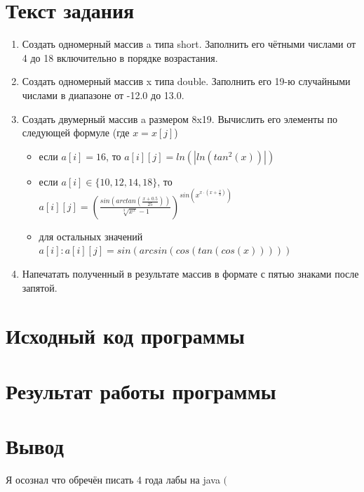 \documentclass{article}
\begin{document}


\section*{Текст задания}

\begin{enumerate}
  \item Создать одномерный массив a типа short. Заполнить его чётными числами от 4 до 18 включительно в порядке возрастания.
  \item Создать одномерный массив x типа double. Заполнить его 19-ю случайными числами в диапазоне от -12.0 до 13.0.
  \item Создать двумерный массив a размером 8x19. Вычислить его элементы по следующей формуле (где $x = x[j]$) \begin{itemize}
          \item если $a[i] = 16$, то $a[i][j] = ln(|ln(tan^2(x))|)$
          \item если $a[i] \in \{10, 12, 14, 18\}$, то $
                  a[i][j] = \left(
                  \frac{
                    sin\left(arctan\left(\frac{x+0.5}{25}\right)\right)
                  }{
                    \sqrt[3]{x^x}-1
                  }
                  \right)^{
                    sin\left(x^{x\cdot\left(x+\frac{2}{3}\right)}\right)
                  }
                $
          \item для остальных значений $a[i]: a[i][j]=sin(arcsin(cos(tan(cos(x)))))$
        \end{itemize}
  \item Напечатать полученный в результате массив в формате с пятью знаками после запятой.
\end{enumerate}

\section*{Исходный код программы}


\section*{Результат работы программы}


\section*{Вывод}
Я осознал что обречён писать 4 года лабы на java $( $
\end{document}
